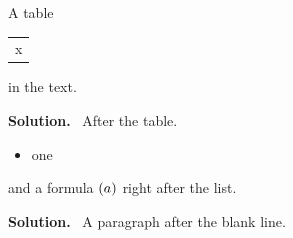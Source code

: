 \documentclass{article}
\newenvironment{solution}{\par\noindent\textbf{Solution.}\ }{\par}
\newenvironment{pair}{(}{)}
\begin{document}
A table \begin{tabular}{l} x \end{tabular} in the text.
\begin{solution}
After the table.
\end{solution}
\begin{itemize}
\item one
\end{itemize}
and a formula $\begin{pair} a \end{pair}$ right after the list.

\begin{solution}
A paragraph after the blank line.
\end{solution}
\end{document}
